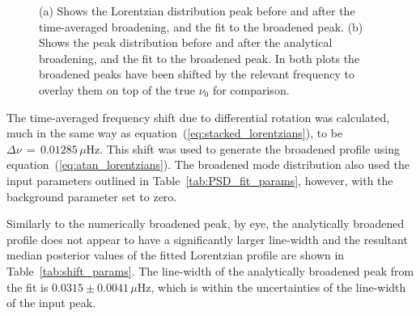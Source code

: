 \begin{figure}[ht!]
	\centering
	\qquad
	\caption{(a) Shows the Lorentzian distribution peak before and after the time-averaged broadening, and the fit to the broadened peak. (b) Shows the peak distribution before and after the analytical broadening, and the fit to the broadened peak. In both plots the broadened peaks have been shifted by the relevant frequency to overlay them on top of the true $\nu_0$ for comparison.} \label{fig:shifted_peaks}
\end{figure}


The time-averaged frequency shift due to differential rotation was calculated, much in the same way as equation~(\ref{eq:stacked_lorentzians}), to be $\Delta\nu \, = \,0.01285 \, \mu\mathrm{Hz}$. This shift was used to generate the broadened profile using equation~(\ref{eq:atan_lorentzians}). The broadened mode distribution also used the input parameters outlined in Table~\ref{tab:PSD_fit_params}, however, with the background parameter set to zero.

Similarly to the numerically broadened peak, by eye, the analytically broadened profile does not appear to have a significantly larger line-width and the resultant median posterior values of the fitted Lorentzian profile are shown in Table~\ref{tab:shift_params}. The line-width of the analytically broadened peak from the fit is $0.0315 \pm 0.0041 \, \mu\mathrm{Hz} $, which is within the uncertainties of the line-width of the input peak.

